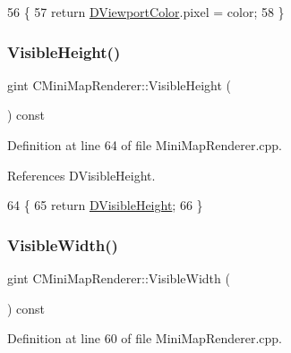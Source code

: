 \begin{DoxyCode}
56                                                     \{
57     \textcolor{keywordflow}{return} \hyperlink{classCMiniMapRenderer_a6a4f56052a4ced356448f5f1cc9a465e}{DViewportColor}.pixel = color;
58 \}
\end{DoxyCode}
\hypertarget{classCMiniMapRenderer_a2681c028e9f9ad916881a06846cd7110}{}\label{classCMiniMapRenderer_a2681c028e9f9ad916881a06846cd7110} 
\subsubsection{\texorpdfstring{Visible\+Height()}{VisibleHeight()}}
{\footnotesize\ttfamily gint C\+Mini\+Map\+Renderer\+::\+Visible\+Height (\begin{DoxyParamCaption}{ }\end{DoxyParamCaption}) const}



Definition at line 64 of file Mini\+Map\+Renderer.\+cpp.



References D\+Visible\+Height.


\begin{DoxyCode}
64                                           \{
65     \textcolor{keywordflow}{return} \hyperlink{classCMiniMapRenderer_aad56353e51a1a3da66d3428cf0f1ccf8}{DVisibleHeight};
66 \}
\end{DoxyCode}
\hypertarget{classCMiniMapRenderer_ac81d364e25f10efe5fdcd71aee03e60d}{}\label{classCMiniMapRenderer_ac81d364e25f10efe5fdcd71aee03e60d} 
\subsubsection{\texorpdfstring{Visible\+Width()}{VisibleWidth()}}
{\footnotesize\ttfamily gint C\+Mini\+Map\+Renderer\+::\+Visible\+Width (\begin{DoxyParamCaption}{ }\end{DoxyParamCaption}) const}



Definition at line 60 of file Mini\+Map\+Renderer.\+cpp.



